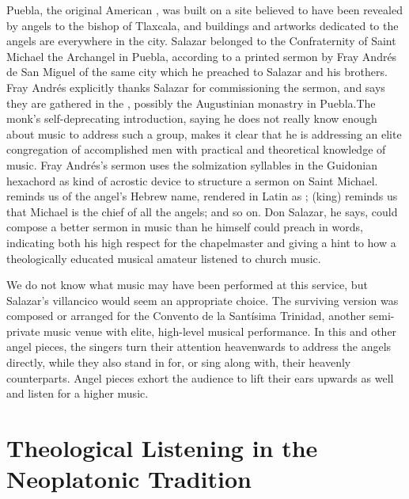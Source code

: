 Puebla, the original American , was built on a site
believed to have been revealed by angels to the bishop of Tlaxcala, and
buildings and artworks dedicated to the angels are everywhere in the city.
Salazar belonged to the Confraternity of Saint Michael the Archangel in Puebla,
according to a printed sermon by Fray Andrés de San Miguel of the same city
which he preached to Salazar and his brothers.%
Fray Andrés explicitly thanks Salazar for commissioning the sermon, and says
they are gathered in the , possibly the
Augustinian monastry in Puebla.\XXX[check]
The monk's self-deprecating introduction, saying he does not really know enough
about music to address such a group, makes it clear that he is addressing an
elite congregation of accomplished men with practical and theoretical knowledge
of music.
Fray Andrés's sermon uses the solmization syllables in the Guidonian hexachord
as kind of acrostic device to structure a sermon on Saint Michael.
 reminds us of the angel's Hebrew name, rendered in Latin as
;  (king) reminds us that Michael is the chief
of all the angels; and so on.
Don Salazar, he says, could compose a better sermon in music than he himself
could preach in words, indicating both his high respect for the chapelmaster
and giving a hint to how a theologically educated musical amateur listened to
church music.

We do not know what music may have been performed at this service, but
Salazar's villancico  would seem an appropriate choice.
The surviving version was composed or arranged for the Convento de la Santísima
Trinidad, another semi-private music venue with elite, high-level musical
performance.
In this and other angel pieces, the singers turn their attention heavenwards to
address the angels directly, while they also stand in for, or sing along
with, their heavenly counterparts.
Angel pieces exhort the audience to lift their ears upwards as well and listen
for a higher music.

\section{Theological Listening in the Neoplatonic Tradition}

